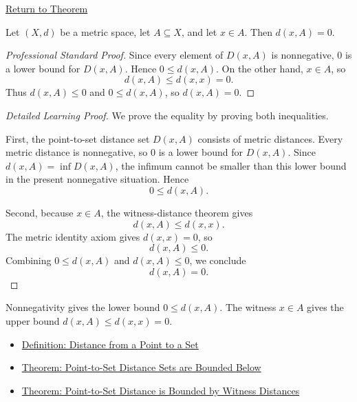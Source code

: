 \newpage
{}
\label{prf:metric-distance-to-set-zero-of-mem}

\begin{remark*}[Return]
\hyperref[thm:metric-distance-to-set-zero-of-mem]{Return to Theorem}
\end{remark*}

\begin{theorem*}
Let \((X,d)\) be a metric space, let \(A\subseteq X\), and let \(x\in A\).
Then \(d(x,A)=0\).
\end{theorem*}

\begin{proof}[Professional Standard Proof]
\LRAProofBodyStart
Since every element of \(D(x,A)\) is nonnegative, \(0\) is a lower bound for
\(D(x,A)\).  Hence \(0\leq d(x,A)\).  On the other hand, \(x\in A\), so
\[
  d(x,A)\leq d(x,x)=0.
\]
Thus \(d(x,A)\leq 0\) and \(0\leq d(x,A)\), so \(d(x,A)=0\).
\end{proof}

\begin{proof}[Detailed Learning Proof]
\LRAProofBodyStart
We prove the equality by proving both inequalities.

First, the point-to-set distance set \(D(x,A)\) consists of metric distances.
Every metric distance is nonnegative, so \(0\) is a lower bound for
\(D(x,A)\).  Since \(d(x,A)=\inf D(x,A)\), the infimum cannot be smaller than
this lower bound in the present nonnegative situation.  Hence
\[
  0\leq d(x,A).
\]

Second, because \(x\in A\), the witness-distance theorem gives
\[
  d(x,A)\leq d(x,x).
\]
The metric identity axiom gives \(d(x,x)=0\), so
\[
  d(x,A)\leq 0.
\]
Combining \(0\leq d(x,A)\) and \(d(x,A)\leq 0\), we conclude
\[
  d(x,A)=0.
\]
\end{proof}

\begin{remark*}
Nonnegativity gives the lower bound \(0\leq d(x,A)\).  The witness \(x\in A\)
gives the upper bound \(d(x,A)\leq d(x,x)=0\).
\end{remark*}

\begin{dependencies}
\begin{itemize}
  \item \hyperref[def:metric-point-set-distance]{Definition: Distance from a Point to a Set}
  \item \hyperref[thm:metric-distance-set-bounded-below]{Theorem: Point-to-Set Distance Sets are Bounded Below}
  \item \hyperref[thm:metric-distance-to-set-le-distance-to-point-of-mem]{Theorem: Point-to-Set Distance is Bounded by Witness Distances}
\end{itemize}
\end{dependencies}

\clearpage
